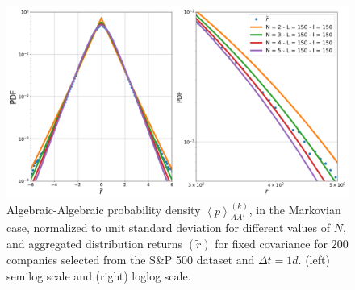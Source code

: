 \begin{figure}[htbp]
    \centering
    \includegraphics[width=0.7\columnwidth]
    {figures/08_aa.png}
    \caption{Algebraic-Algebraic probability density
             $\left\langle p \right\rangle_{AA'}^{\left(k\right)}$, in the
             Markovian case, normalized to unit standard deviation for
             different values of $N$, and aggregated distribution returns
             $\left(\tilde{r}\right)$ for fixed covariance for $200$ companies
             selected from the S\&P 500 dataset and $\Delta t = 1d$. (left)
             semilog scale and (right) loglog scale.}
    \label{fig:aa_dist}
\end{figure}

